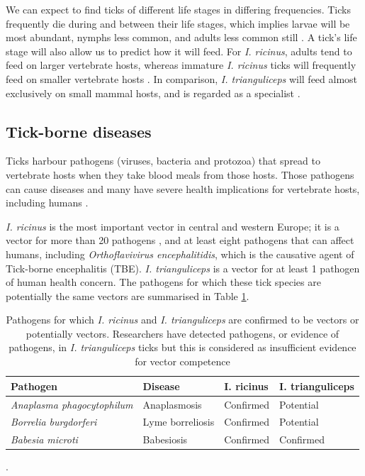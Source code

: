 \documentclass[hidelinks]{article}
\begin{document}
We can expect to find ticks of different life stages in differing frequencies. Ticks frequently die during and between their life stages, which implies larvae will be most abundant, nymphs less common, and adults less common still \citep{Randolph1998}. A tick's life stage will also allow us to predict how it will feed. For \textit{I. ricinus}, adults tend to feed on larger vertebrate hosts, whereas immature \textit{I. ricinus} ticks will frequently feed on smaller vertebrate hosts \citep{Herrmann2015, Randolph1998}. In comparison, \textit{I. trianguliceps} will feed almost exclusively on small mammal hosts, and is regarded as a specialist \citep{Bown2003, Bown2008}.

\subsection{Tick-borne diseases}

Ticks harbour pathogens (viruses, bacteria and protozoa) that spread to vertebrate hosts when they take blood meals from those hosts. Those pathogens can cause diseases and many have severe health implications for vertebrate hosts, including humans \citep{Johnson2023e}.

\textit{I. ricinus} is the most important vector in central and western Europe; it is a vector for more than 20 pathogens \citep{Sprong2018}, and at least eight pathogens that can affect humans, including \textit{Orthoflavivirus encephalitidis}, which is the causative agent of Tick-borne encephalitis (TBE). \textit{I. trianguliceps} is a vector for at least 1 pathogen of human health concern. The pathogens for which these tick species are potentially the same vectors are summarised in Table \ref{tab:common_pathogens}.

\begin{table}[]
	\begin{mdframed}[backgroundcolor=grey250,rightline=false,leftline=false,topline=false]
	\centering
		\begin{tabular}{|l|l|l|l|}
			\hline
			\textbf{Pathogen}                  & \textbf{Disease} & \textbf{I. ricinus} & \textbf{I. trianguliceps} \\ \hline
			\textit{Anaplasma phagocytophilum} & Anaplasmosis     & Confirmed           & Potential                \\ \hline
			\textit{Borrelia burgdorferi}      & Lyme borreliosis & Confirmed           & Potential                \\ \hline
			\textit{Babesia microti}           & Babesiosis       & Confirmed           & Confirmed                 \\ \hline
		\end{tabular}
		\caption{Pathogens for which \textit{I. ricinus} and \textit{I. trianguliceps} are confirmed to be vectors or potentially vectors. Researchers have detected pathogens, or evidence of pathogens, in \textit{I. trianguliceps} ticks but this is considered as insufficient evidence for vector competence \citep{Gray2024, Rubel_2023}}.
		\label{tab:common_pathogens}
	\end{mdframed}
\end{table}
\end{document}
